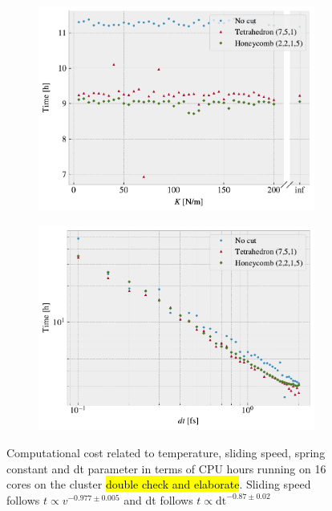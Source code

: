 \begin{figure}[H]
\begin{subfigure}[t]{0.49\textwidth}
      \includegraphics[width=\textwidth]{figures/baseline/comp_cost_K.pdf}
      \caption{}
      \label{fig:comp_K}
    \end{subfigure}
    \hfill
    \begin{subfigure}[t]{0.49\textwidth}
        \centering
        \includegraphics[width=\textwidth]{figures/baseline/comp_cost_dt.pdf}
        \caption{}
        \label{fig:comp_dt}
    \end{subfigure}
    \hfill
    \caption{Computational cost related to temperature, sliding speed, spring
    constant and dt parameter in terms of CPU hours running on 16 cores on the
    cluster \hl{double check and elaborate}. Sliding speed follows $t \propto
    v^{-0.977 \pm 0.005}$ and dt follows $t \propto \text{dt}^{-0.87\pm 0.02}$}
    \label{fig:comp_cost}
\end{figure}


